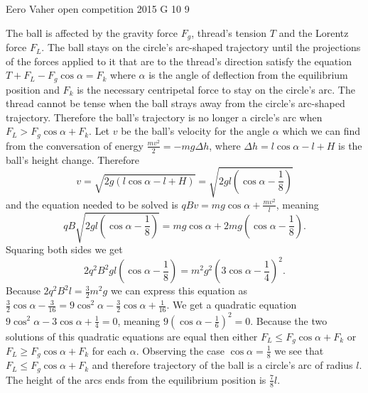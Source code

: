 \documentclass[11pt]{article}
\begin{document}
{Eero Vaher} %
{open competition} %
{2015} %
{G 10} %
{9} %
{

\ifEngSolution
The ball is affected by the gravity force $F_g$, thread’s tension $T$ and the Lorentz force $F_L$. The ball stays on the circle’s arc-shaped trajectory until the projections of the forces applied to it that are to the thread’s direction satisfy the equation $T+F_L-F_g\cos\alpha=F_k$ where $\alpha$ is the angle of deflection from the equilibrium position and $F_k$ is the necessary centripetal force to stay on the circle’s arc. The thread cannot be tense when the ball strays away from the circle’s arc-shaped trajectory. Therefore the ball’s trajectory is no longer a circle’s arc when $F_L>F_g\cos\alpha+F_k$. Let $v$ be the ball’s velocity for the angle $\alpha$ which we can find from the conversation of energy $\frac{mv^2}{2}=-mg\Delta h$, where $\Delta h=l\cos\alpha-l+H$ is the ball’s height change. Therefore 
\[
v=\sqrt{2g\left(l\cos\alpha-l+H\right)}=\sqrt{2gl\left(\cos\alpha-\frac{1}{8}\right)}
\]
and the equation needed to be solved is $qBv=mg\cos\alpha+\frac{mv^2}{l}$, meaning
\[
qB\sqrt{2gl\left(\cos\alpha-\frac{1}{8}\right)}=mg\cos\alpha+2mg\left(\cos\alpha-\frac{1}{8}\right).
\]
Squaring both sides we get
\[
2q^2B^2gl\left(\cos\alpha-\frac{1}{8}\right)=m^2g^2\left(3\cos\alpha-\frac{1}{4}\right)^2.
\]
Because $2q^2B^2l=\frac{3}{2}m^2g$ we can express this equation as $\frac{3}{2}\cos\alpha-\frac{3}{16}=9\cos^2\alpha-\frac{3}{2}\cos\alpha+\frac{1}{16}$. We get a quadratic equation $9\cos^2\alpha-3\cos\alpha+\frac{1}{4}=0$, meaning $9\left(\cos\alpha-\frac{1}{6}\right)^2=0$. Because the two solutions of this quadratic equations are equal then either $F_L\leq F_g\cos\alpha+F_k$ or $F_L\geq F_g\cos\alpha+F_k$ for each $\alpha$. Observing the case $\cos\alpha=\frac{1}{8}$ we see that $F_L\leq F_g\cos\alpha+F_k$ and therefore trajectory of the ball is a circle’s arc of radius $l$. The height of the arcs ends from the equilibrium position is $\frac{7}{8}l$.
\fi
}
\end{document}
